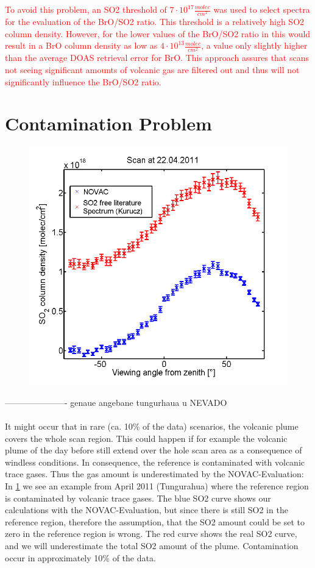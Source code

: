 \documentclass  [
  paper    = a4,
  BCOR     = 10mm,
  twoside,
  fontsize = 12pt,
  fleqn,
  toc      = bibnumbered,
  toc      = listofnumbered,
  numbers  = noendperiod,
  headings = normal,
  listof   = leveldown,
  version  = 3.03
]                                       {scrreprt}
\begin{document}
	\textcolor{red}{	
	To avoid this problem, an SO2 threshold of $7\cdot 10^{17} \frac{molec}{cm^2}$ was used
	to select spectra for the evaluation of the BrO/SO2 ratio. This threshold is
	a relatively high SO2 column density. However, for the lower values of the
	BrO/SO2 ratio in  this would result in a BrO column
	density as low as $4\cdot 10^{13} \frac{molec}{cm^2}$, a value only slightly higher than the
	average DOAS retrieval error for BrO. This approach assures that scans not seeing
	significant amounts of volcanic gas are filtered out and thus will not significantly
	influence the BrO/SO2 ratio. \citealp{lubcke2014bro}}
	
	\section{Contamination Problem}
	\begin{figure}
		\centering
		\includegraphics[width=0.7\linewidth]{Bilder/contaminated}
		\caption{}
		\label{fig:contaminated}
	\end{figure}
	---------------------- genaue angebane tungurhaua u NEVADO\\
	\\
	It might occur that in rare (ca. 10\% of the data) scenarios, the
	volcanic plume covers the whole scan region.
	This could happen if for example the volcanic plume of the day before still extend over the hole scan area as a consequence of windless conditions.
	In consequence, the reference	is contaminated with volcanic trace gases. Thus the gas amount is underestimated by the NOVAC-Evaluation: In \cref{fig:contaminated} we see an example from April 2011 (Tungurahua) where the reference region is contaminated by volcanic trace gases. The blue SO2 curve shows our calculations with the NOVAC-Evaluation, but since there is still SO2 in the reference region, therefore the assumption, that the SO2 amount could be set to zero in the reference region is wrong. The red curve shows the real SO2 curve, and we will underestimate the total SO2 amount of the plume. Contamination occur in approximately 10$\%$ of the data.\\
\end{document}
